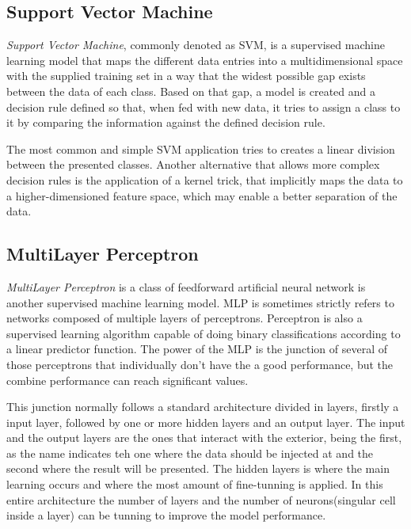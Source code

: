 \documentclass[extendedabs]{recpad2k}
\begin{document}
\subsection{Support Vector Machine}
\textit{Support Vector Machine}, commonly denoted as SVM, is a supervised machine learning model that maps the different data entries into a multidimensional 
space with the supplied training set in a way that the widest possible gap exists between the data of each class. 
Based on that gap, a model is created and a decision rule defined so that, when fed with new data, it tries to assign a class to it by comparing the information 
against the defined decision rule.

The most common and simple SVM application tries to creates a linear division between the presented classes. Another alternative that allows more complex 
decision rules is the application of a kernel trick, that implicitly maps the data to a higher-dimensioned feature space, which may enable a better separation 
of the data.

\subsection{MultiLayer Perceptron}
\textit{MultiLayer Perceptron} is a class of feedforward artificial neural network is another supervised machine learning model. MLP is sometimes strictly 
refers to networks composed of multiple layers of perceptrons. Perceptron is also a supervised learning algorithm capable of doing binary classifications 
according to a linear predictor function. The power of the MLP is the junction of several of those perceptrons that individually don't have the a good 
performance, but the combine performance can reach significant values.

This junction normally follows a standard architecture divided in layers, firstly a input layer, followed by one or more hidden layers and an output layer. 
The input and the output layers are the ones that interact with the exterior, being the first, as the name indicates teh one where the data should be injected 
at and the second where the result will be presented. The hidden layers is where the main learning occurs and where the most amount of fine-tunning is applied. 
In this entire architecture the number of layers and the number of neurons(singular cell inside a layer) can be tunning to improve the model performance.
\end{document}
